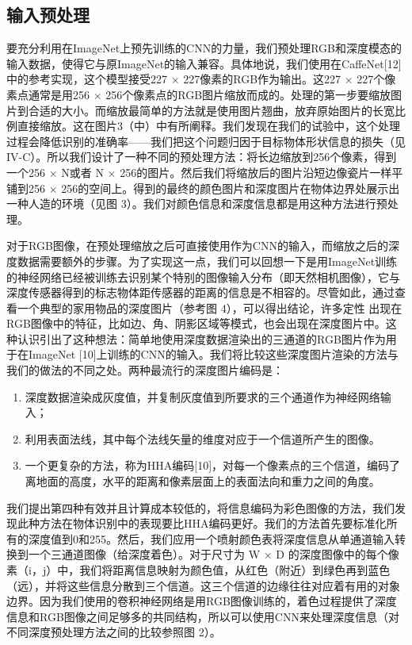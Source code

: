 \subsection{输入预处理}

要充分利用在ImageNet上预先训练的CNN的力量，我们预处理RGB和深度模态的输入数据，使得它与原ImageNet的输入兼容。具体地说，我们使用在CaffeNet[12]中的参考实现，这个模型接受227 $\times$ 227像素的RGB作为输出。这227 $\times$ 227个像素点通常是用256 $\times$ 256个像素点的RGB图片缩放而成的。处理的第一步要缩放图片到合适的大小。而缩放最简单的方法就是使用图片翘曲，放弃原始图片的长宽比例直接缩放。这在图片3（中）中有所阐释。我们发现在我们的试验中，这个处理过程会降低识别的准确率——我们把这个问题归因于目标物体形状信息的损失（见IV-C）。所以我们设计了一种不同的预处理方法：将长边缩放到256个像素，得到一个256 $\times$ N或者 N $\times$ 256的图片。然后我们将缩放后的图片沿短边像瓷片一样平铺到256 $\times$ 256的空间上。得到的最终的颜色图片和深度图片在物体边界处展示出一种人造的环境（见图 3）。我们对颜色信息和深度信息都是用这种方法进行预处理。

对于RGB图像，在预处理缩放之后可直接使用作为CNN的输入，而缩放之后的深度数据需要额外的步骤。为了实现这一点，我们可以回想一下是用ImageNet训练的神经网络已经被训练去识别某个特别的图像输入分布（即天然相机图像），它与深度传感器得到的标志物体距传感器的距离的信息是不相容的。尽管如此，通过查看一个典型的家用物品的深度图片（参考图 4），可以得出结论，许多定性
出现在RGB图像中的特征，比如边、角、阴影区域等模式，也会出现在深度图片中。这种认识引出了这种想法：简单地使用深度数据渲染出的三通道的RGB图片作为用于在ImageNet [10]上训练的CNN的输入。我们将比较这些深度图片渲染的方法与我们的做法的不同之处。两种最流行的深度图片编码是：
\begin{enumerate}
\item 深度数据渲染成灰度值，并复制灰度值到所要求的三个通道作为神经网络输入；
\item 利用表面法线，其中每个法线矢量的维度对应于一个信道所产生的图像。
\item 一个更复杂的方法，称为HHA编码[10]，对每一个像素点的三个信道，编码了离地面的高度，水平的距离和像素层面上的表面法向和重力之间的角度。
\end{enumerate}


我们提出第四种有效并且计算成本较低的，将信息编码为彩色图像的方法，我们发现此种方法在物体识别中的表现要比HHA编码更好。我们的方法首先要标准化所有的深度值到0和255。然后，我们应用一个喷射颜色表将深度信息从单通道输入转换到一个三通道图像（给深度着色）。对于尺寸为 W $\times$ D 的深度图像中的每个像素（i，j）中，我们将距离信息映射为颜色值，从红色（附近）到绿色再到蓝色（远），并将这些信息分散到三个信道。这三个信道的边缘往往对应着有用的对象边界。因为我们使用的卷积神经网络是用RGB图像训练的，着色过程提供了深度信息和RGB图像之间足够多的共同结构，所以可以使用CNN来处理深度信息（对不同深度预处理方法之间的比较参照图 2）。

